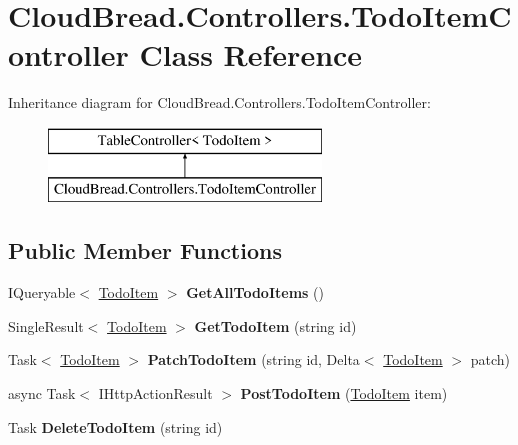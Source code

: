 \hypertarget{a00188}{}\section{Cloud\+Bread.\+Controllers.\+Todo\+Item\+Controller Class Reference}
\label{a00188}
Inheritance diagram for Cloud\+Bread.\+Controllers.\+Todo\+Item\+Controller\+:\begin{figure}[H]
\begin{center}
\leavevmode
\includegraphics[height=2.000000cm]{a00188}
\end{center}
\end{figure}
\subsection*{Public Member Functions}
\begin{DoxyCompactItemize}
\item 
I\+Queryable$<$ \hyperlink{a00187}{Todo\+Item} $>$ {\bfseries Get\+All\+Todo\+Items} ()\hypertarget{a00188_a398f4bd7f64525eeb81d5c9c8efcaaaa}{}\label{a00188_a398f4bd7f64525eeb81d5c9c8efcaaaa}

\item 
Single\+Result$<$ \hyperlink{a00187}{Todo\+Item} $>$ {\bfseries Get\+Todo\+Item} (string id)\hypertarget{a00188_a02499ac4f50528b41b89b02862751a64}{}\label{a00188_a02499ac4f50528b41b89b02862751a64}

\item 
Task$<$ \hyperlink{a00187}{Todo\+Item} $>$ {\bfseries Patch\+Todo\+Item} (string id, Delta$<$ \hyperlink{a00187}{Todo\+Item} $>$ patch)\hypertarget{a00188_ac6bb62e5c6bfaeda1a49c85451adbe02}{}\label{a00188_ac6bb62e5c6bfaeda1a49c85451adbe02}

\item 
async Task$<$ I\+Http\+Action\+Result $>$ {\bfseries Post\+Todo\+Item} (\hyperlink{a00187}{Todo\+Item} item)\hypertarget{a00188_a334545b9f651cc161b2218d22ebcf15e}{}\label{a00188_a334545b9f651cc161b2218d22ebcf15e}

\item 
Task {\bfseries Delete\+Todo\+Item} (string id)\hypertarget{a00188_a618193fc125f6df8bf754a077e4b6b8d}{}\label{a00188_a618193fc125f6df8bf754a077e4b6b8d}

\end{DoxyCompactItemize}
